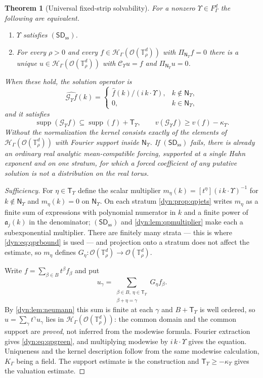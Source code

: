 \documentclass[11pt,letterpaper]{article}
\newtheorem{theorem}{Theorem}[section]
\theoremstyle{definition}
\theoremstyle{remark}
\newcommand{\HH}{\mathscr H}
\newcommand{\OO}{\mathcal O}
\newcommand{\supp}{\operatorname{supp}}
\newcommand{\sdss}{\mathsf{SD}_{\mathrm{ss}}}
\newcommand{\TT}{\mathbb T}
\newcommand{\strip}{\OO(\TT^{d}_{\rho})}
\newcommand{\Cups}{\mathcal C_{\Upsilon}}
\newcommand{\Gups}{\mathcal G_{\Upsilon}}
\newcommand{\Tups}{\mathsf T_{\Upsilon}}
\newcommand{\qlat}{\mathsf N_{\Upsilon}}
\newcommand{\kups}{\kappa_{\Upsilon}}
\newcommand{\fla}{\mathfrak a}
\numberwithin{equation}{section}
\begin{document}
\begin{theorem}[Universal fixed-strip solvability]\label{dyn:thm:qplinear}
For a nonzero $\Upsilon\in F_\Gamma^{d}$ the following are equivalent.
\begin{enumerate}[label=(\roman*),leftmargin=*]
\item $\Upsilon$ satisfies $(\sdss)$.
\item For every $\rho>0$ and every $f\in\HH_\Gamma(\strip)$ with
$\Pi_{\qlat}f=0$ there is a unique $u\in\HH_\Gamma(\strip)$ with
$\Cups u=f$ and $\Pi_{\qlat}u=0$.
\end{enumerate}
When these hold, the solution operator is
\begin{equation}\label{dyn:eq:qpgreen}
 \widehat{\Gups f}(k)=
 \begin{cases}
 \widehat f(k)/(i\,k\cdot\Upsilon), & k\notin\qlat,\\
 0,& k\in\qlat,
 \end{cases}
\end{equation}
and it satisfies
\begin{equation}\label{dyn:eq:qpgreensupport}
 \supp(\Gups f)\subseteq\supp(f)+\Tups,\qquad
 v(\Gups f)\ge v(f)-\kups .
\end{equation}
Without the normalization the kernel consists exactly of the elements of
$\HH_\Gamma(\strip)$ with Fourier support inside $\qlat$. If $(\sdss)$
fails, there is already an ordinary real analytic mean-compatible forcing,
supported at a single Hahn exponent and on one stratum, for which a forced
coefficient of any putative solution is not a distribution on the real
torus.
\end{theorem}
\begin{proof}[Sufficiency]
For $\eta\in\Tups$ define the scalar multiplier
$m_\eta(k)=[t^{\eta}](i\,k\cdot\Upsilon)^{-1}$ for $k\notin\qlat$ and
$m_\eta(k)=0$ on $\qlat$. On each stratum \cref{dyn:prop:qpjets} writes
$m_\eta$ as a finite sum of expressions with polynomial numerator in $k$
and a finite power of $\fla_j(k)$ in the denominator; $(\sdss)$ and
\cref{dyn:lem:qpmultiplier} make each a subexponential multiplier. There
are finitely many strata --- this is where \eqref{dyn:eq:qprbound} is used
--- and projection onto a stratum does not affect the estimate, so $m_\eta$
defines $G_\eta:\strip\to\strip$.

Write $f=\sum_{\beta\in B}t^{\beta}f_\beta$ and put
\begin{equation}\label{dyn:eq:qpgreencoefficient}
 u_\gamma=\sum_{\substack{\beta\in B,\ \eta\in\Tups\\ \beta+\eta=\gamma}}
 G_\eta f_\beta .
\end{equation}
By \cref{dyn:lem:neumann} this sum is finite at each $\gamma$ and
$B+\Tups$ is well ordered, so $u=\sum_\gamma t^{\gamma}u_\gamma$ lies in
$\HH_\Gamma(\strip)$: the common domain and the common support are
\emph{proved}, not inferred from the modewise formula. Fourier extraction
gives \eqref{dyn:eq:qpgreen}, and multiplying modewise by
$i\,k\cdot\Upsilon$ gives the equation. Uniqueness and the kernel
description follow from the same modewise calculation, $K_\Gamma$ being a
field. The support estimate is the construction and
$\Tups\ge-\kups$ gives the valuation estimate.
\end{proof}
\end{document}
